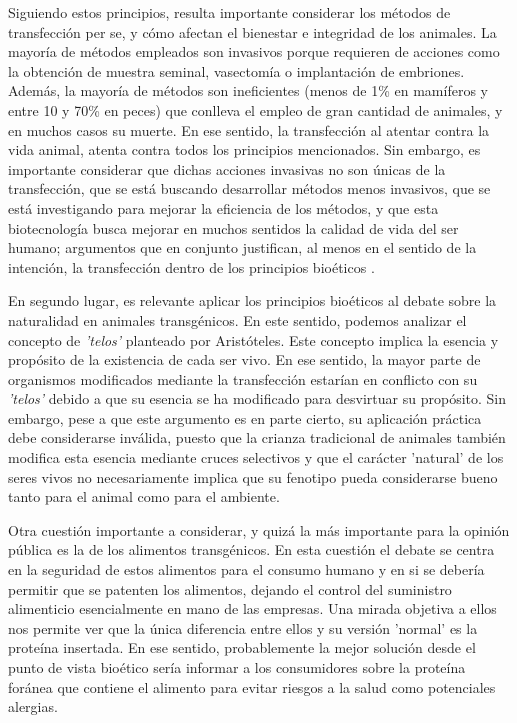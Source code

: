 \documentclass[fleqn,10pt]{SelfArx} %
\begin{document}
Siguiendo estos principios, resulta importante considerar los métodos de transfección per se, y cómo afectan el bienestar e integridad de los animales. La mayoría de métodos empleados son invasivos porque requieren de acciones como la obtención de muestra seminal, vasectomía o implantación de embriones. Además, la mayoría de métodos son ineficientes (menos de 1\% en mamíferos y entre 10 y 70\% en peces)  que conlleva el empleo de gran cantidad de animales, y en muchos casos su muerte. En ese sentido, la transfección al atentar contra la vida animal, atenta contra todos los principios mencionados. Sin embargo, es importante considerar que dichas acciones invasivas no son únicas de la transfección, que se está buscando desarrollar métodos menos invasivos, que se está investigando para mejorar la eficiencia de los métodos, y que esta biotecnología busca mejorar en muchos sentidos la calidad de vida del ser humano; argumentos que en conjunto justifican, al menos en el sentido de la intención, la transfección dentro de los principios bioéticos \cite{mepham1998use,christiansen2000bioethics, lassen2006after, niemann2007transgenic, Ormandy}. 

En segundo lugar, es relevante aplicar los principios bioéticos al debate sobre la naturalidad en animales transgénicos. En este sentido, podemos analizar el concepto de \textit{'telos'} planteado por Aristóteles. Este concepto implica la esencia y propósito de la existencia de cada ser vivo. En ese sentido, la mayor parte de organismos modificados mediante la transfección estarían en conflicto con su \textit{'telos'} debido a que su esencia se ha modificado para desvirtuar su propósito\cite{Rollin1998}. Sin embargo, pese a que este argumento es en parte cierto, su aplicación práctica debe considerarse inválida, puesto que la crianza tradicional de animales también modifica esta esencia mediante cruces selectivos y que el carácter 'natural' de los seres vivos no necesariamente implica que su fenotipo pueda considerarse bueno tanto para el animal como para el ambiente\cite{Verhoog2003294, Ormandy}. 


Otra cuestión importante a considerar, y quizá la más importante para la opinión pública es la de los alimentos transgénicos. En esta cuestión el debate se centra en la seguridad de estos alimentos para el consumo humano y en si se debería permitir que se patenten los alimentos, dejando el control del suministro alimenticio esencialmente en mano de las empresas. Una mirada objetiva a ellos nos permite ver que la única diferencia entre ellos y su versión 'normal' es la proteína insertada. En ese sentido, probablemente la mejor solución desde el punto de vista bioético sería informar a los consumidores sobre la proteína foránea que contiene el alimento para evitar riesgos a la salud como potenciales alergias\cite{berkowitz1994transgenic, Jefferson, ledford2013transgenic}. 
\end{document}
